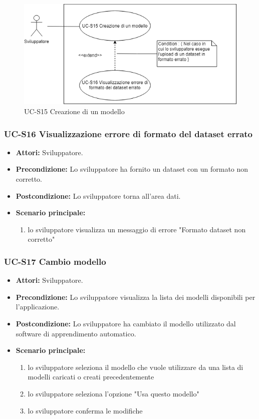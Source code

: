 		\begin{figure}[h]
			\centering
			\includegraphics[scale=0.7]{images/UC-S15.png}
				\caption{UC-S15 Creazione di un modello}
		\end{figure}	
	
	\subsubsection{UC-S16 Visualizzazione errore di formato del dataset errato}	
	\begin{itemize}					
			\item \textbf{Attori:} Sviluppatore.
			\item \textbf{Precondizione:} Lo sviluppatore ha fornito un dataset con un formato non corretto.
			\item \textbf{Postcondizione:} Lo sviluppatore torna all'area dati.
			\item \textbf{Scenario principale:}
				\begin{enumerate}
					\item lo sviluppatore visualizza un messaggio di errore "Formato dataset non corretto"
				\end{enumerate}	
		\end{itemize}		
	
	\subsubsection{UC-S17 Cambio modello}
	\begin{itemize}					
			\item \textbf{Attori:} Sviluppatore.
			\item \textbf{Precondizione:} Lo sviluppatore visualizza la lista dei modelli disponibili per l'applicazione.
			\item \textbf{Postcondizione:} Lo sviluppatore ha cambiato il modello utilizzato dal software di apprendimento automatico.
			\item \textbf{Scenario principale:}
				\begin{enumerate}
					\item lo sviluppatore seleziona il modello che vuole utilizzare da una lista di modelli caricati o creati precedentemente
					\item lo sviluppatore seleziona l'opzione "Usa questo modello"
					\item lo sviluppatore conferma le modifiche
				\end{enumerate}	
		\end{itemize}		
	
